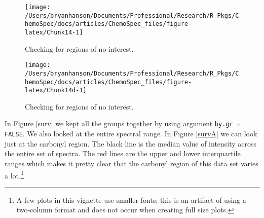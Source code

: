 \documentclass[letter,10pt,twocolumn,twoside,printwatermark=false]{pinp}
\begin{document}
\begin{figure}

{\centering \texttt{[image: /Users/bryanhanson/Documents/Professional/Research/R\_Pkgs/ChemoSpec/docs/articles/ChemoSpec\_files/figure-latex/Chunk14-1]} 

}

\caption{\label{surv}Checking for regions of no interest.}\label{fig:Chunk14}
\end{figure}

\begin{Shaded}
\begin{Highlighting}[]
   \NormalTok{,}
\end{Highlighting}
\end{Shaded}

\begin{figure}

{\centering \texttt{[image: /Users/bryanhanson/Documents/Professional/Research/R\_Pkgs/ChemoSpec/docs/articles/ChemoSpec\_files/figure-latex/Chunk14d-1]} 

}

\caption{\label{surv2}Checking for regions of no interest.}\label{fig:Chunk14d}
\end{figure}

In Figure \ref{surv} we kept all the groups together by using argument
\texttt{by.gr = FALSE}. We also looked at the entire spectral range. In
Figure \ref{survA} we can look just at the carbonyl region. The black
line is the median value of intensity across the entire set of spectra.
The red lines are the upper and lower interquartile ranges which makes
it pretty clear that the carbonyl region of this data set varies a
lot.\footnote{A few plots in this vignette use smaller fonts; this is an artifact of using a two-column format and does not occur when creating full size plots.}

\begin{Shaded}
\begin{Highlighting}[]
   \NormalTok{,}
   \NormalTok{,}
   \NormalTok{,}
   \NormalTok{(}\NormalTok{, }\NormalTok{))}
\end{Highlighting}
\end{Shaded}
\end{document}
